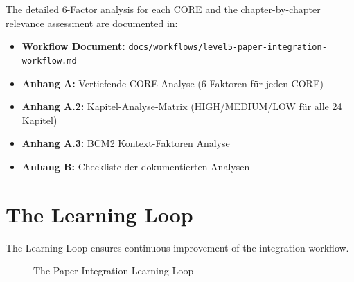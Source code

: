 The detailed 6-Factor analysis for each CORE and the chapter-by-chapter relevance assessment are documented in:
\begin{itemize}
    \item \textbf{Workflow Document:} \texttt{docs/workflows/level5-paper-integration-workflow.md}
    \item \textbf{Anhang A:} Vertiefende CORE-Analyse (6-Faktoren für jeden CORE)
    \item \textbf{Anhang A.2:} Kapitel-Analyse-Matrix (HIGH/MEDIUM/LOW für alle 24 Kapitel)
    \item \textbf{Anhang A.3:} BCM2 Kontext-Faktoren Analyse
    \item \textbf{Anhang B:} Checkliste der dokumentierten Analysen
\end{itemize}


\section{The Learning Loop}
\label{sec:paperint-learning-loop}

The Learning Loop ensures continuous improvement of the integration workflow.

\begin{figure}[htbp]
\centering
{}
\caption{The Paper Integration Learning Loop}
\label{fig:learning-loop}
\end{figure}

